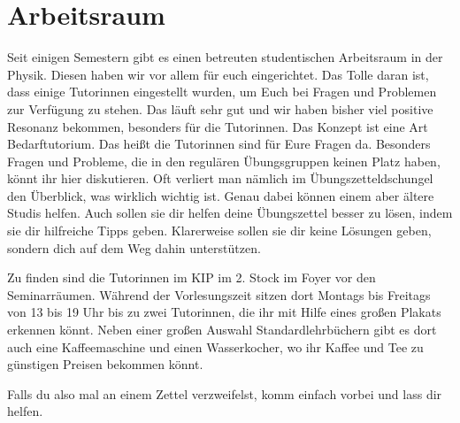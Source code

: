 \section{Arbeitsraum}
\label{sec:arbeitsraum}
Seit einigen Semestern gibt es einen betreuten studentischen Arbeitsraum in der Physik. Diesen haben wir vor allem für euch eingerichtet. Das Tolle daran ist, dass einige Tutorinnen eingestellt wurden, um Euch bei Fragen und Problemen zur Verfügung zu stehen. Das läuft sehr gut und wir haben bisher viel positive Resonanz bekommen, besonders für die Tutorinnen. Das Konzept ist eine Art Bedarftutorium. Das heißt die Tutorinnen sind für Eure Fragen da. Besonders Fragen und Probleme, die in den regulären Übungsgruppen keinen Platz haben, könnt ihr hier diskutieren. Oft verliert man nämlich im Übungszetteldschungel den Überblick, was wirklich wichtig ist. Genau dabei können einem aber ältere Studis helfen. Auch sollen sie dir helfen deine Übungszettel besser zu lösen, indem sie dir hilfreiche Tipps geben. Klarerweise sollen sie dir keine Lösungen geben, sondern dich auf dem Weg dahin unterstützen.

Zu finden sind die Tutorinnen im KIP im 2. Stock im Foyer vor den Seminarräumen. Während der Vorlesungszeit sitzen dort Montags bis Freitags von 13 bis 19 Uhr bis zu zwei Tutorinnen, die ihr mit Hilfe eines großen Plakats erkennen könnt. Neben einer großen Auswahl Standardlehrbüchern gibt es dort auch eine Kaffeemaschine und einen Wasserkocher, wo ihr Kaffee und Tee zu günstigen Preisen bekommen könnt.

Falls du also mal an einem Zettel verzweifelst, komm einfach vorbei und lass dir helfen.
